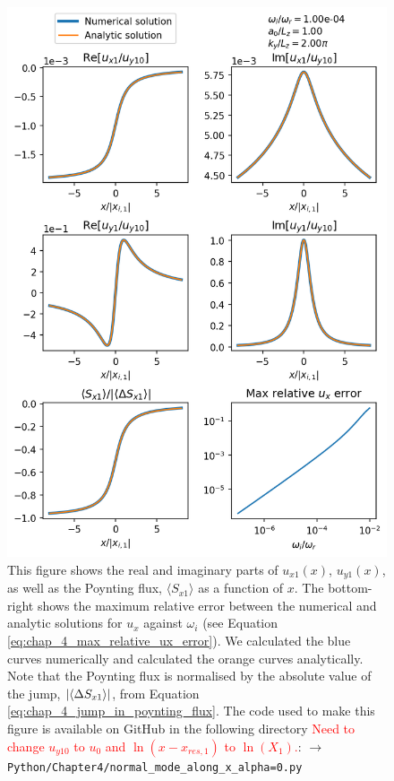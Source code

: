 \begin{figure}
    \centering
    \vspace{-30pt}
    \includegraphics[width=\textwidth,height=0.85\textheight,keepaspectratio]{figures/chapter04/normal_mode_along_x_alpha=0.png}
    \vspace{-10pt}
    \caption{This figure shows the real and imaginary parts of $u_{x1}(x)$, $u_{y1}(x)$, as well as the Poynting flux, $\langle S_{x1}\rangle$ as a function of $x$. The bottom-right shows the maximum relative error between the numerical and analytic solutions for $u_x$ against $\omega_i$ (see Equation \ref{eq:chap_4_max_relative_ux_error}). We calculated the blue curves numerically and calculated the orange curves analytically. Note that the Poynting flux is normalised by the absolute value of the jump, $\abs{\langle\Delta S_{x1}\rangle}$, from Equation \eqref{eq:chap_4_jump_in_poynting_flux}. The code used to make this figure is available on GitHub in the following directory \textcolor{red}{Need to change $u_{y10}$ to $u_0$ and $\ln(x-x_{res,1})$ to $\ln(X_1)$.}:\newline
    \texttt{$\rightarrow$ Python/Chapter4/normal\_mode\_along\_x\_alpha=0.py}}
    \vspace{-20pt}
    \label{fig:normal_mode_along_x_alpha=0}
\end{figure}

